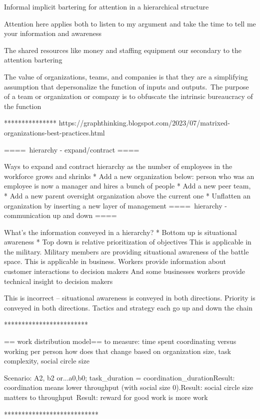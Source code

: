 
Informal implicit bartering for attention in a hierarchical structure

Attention here applies both to listen to my argument and take the time to tell me your information and awareness

The shared resources like money and staffing equipment our secondary to the attention bartering 

The value of organizations, teams, and companies is that they are a simplifying assumption that depersonalize the function of inputs and outputs. The purpose of a team or organization or company is to obfuscate the intrinsic bureaucracy of the function

***************
https://graphthinking.blogspot.com/2023/07/matrixed-organizations-best-practices.html

==== hierarchy - expand/contract ====

Ways to expand and contract hierarchy as the number of employees in the workforce grows and shrinks
* Add a new organization below: person who was an employee is now a manager and hires a bunch of people
* Add a new peer team,
* Add a new parent oversight organization above the current one
* Unflatten an organization by inserting a new layer of management
==== hierarchy - communication up and down ====

What's the information conveyed in a hierarchy?
* Bottom up is situational awareness
* Top down is relative prioritization of objectives
This is applicable in the military. Military members are providing situational awareness of the battle space.
This is applicable in business. Workers provide information about customer interactions to decision makers
And some businesses workers provide technical insight to decision makers

This is incorrect -- situational awareness is conveyed in both directions. Priority is conveyed in both directions. Tactics and strategy each go up and down the chain

************************

== work distribution model==
to measure: time spent coordinating versus working per person
how does that change based on organization size, task complexity, social circle size

Scenario: A2, b2 or...a0,b0; task_duration = coordination_durationResult: coordination means lower throughput (with social size 0).Result: social circle size matters to throughput Result: reward for good work is more work 

***************************

